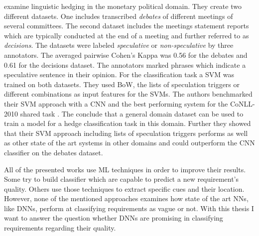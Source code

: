 \textcite{Stajner:2017} examine linguistic hedging in the monetary political domain.
They create two different datasets.
One includes transcribed \textit{debates} of different meetings of several committees.
The second dataset includes the meetings statement reports which are typically conducted at the end of a meeting and further referred to as \textit{decisions}.
The datasets were labeled \textit{speculative} or \textit{non-speculative} by three annotators.
The averaged pairwise Cohen's Kappa \parencite{Cohen:1960} was 0.56 for the debates and 0.61 for the decisions dataset.
The annotators marked phrases which indicate a speculative sentence in their opinion.
For the classification task a \ac{SVM} was trained on both datasets.
They used \ac{BoW}, the lists of speculation triggers or different combinations as input features for the \acp{SVM}.
The authors benchmarked their \ac{SVM} approach with a \ac{CNN} and the best performing system for the CoNLL-2010 shared task \parencite{Farkas:2010}.
The conclude that a general domain dataset can be used to train a model for a hedge classification task in this domain.
Further they showed that their \ac{SVM} approach including lists of speculation triggers performs as well as other state of the art systems in other domains and could outperform the \ac{CNN} classifier on the debates dataset.

All of the presented works use \ac{ML} techniques in order to improve their results.
Some try to build classifier which are capable to predict a new requirement's quality.
Others use those techniques to extract specific cues and their location.
However, none of the mentioned approaches examines how state of the art \acp{NN}, like \acp{DNN}, perform at classifying requirements as vague or not.
With this thesis I want to answer the question whether \acp{DNN} are promising in classifying requirements regarding their quality.
